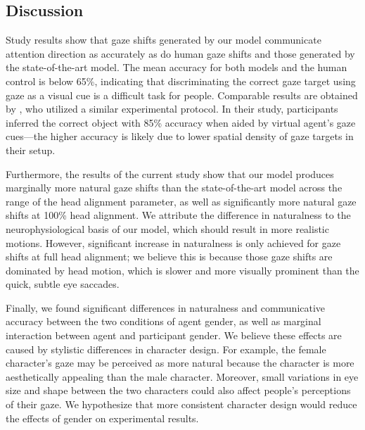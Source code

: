 \subsection{Discussion}

Study results show that gaze shifts generated by our model communicate attention direction as accurately as do human gaze shifts and those generated by the state-of-the-art model. The mean accuracy for both models and the human control is below 65\%, indicating that discriminating the correct gaze target using gaze as a visual cue is a difficult task for people. Comparable results are obtained by \citet{bailly2010gaze}, who utilized a similar experimental protocol. In their study, participants inferred the correct object with 85\% accuracy when aided by virtual agent's gaze cues---the higher accuracy is likely due to lower spatial density of gaze targets in their setup.

Furthermore, the results of the current study show that our model produces marginally more natural gaze shifts than the state-of-the-art model across the range of the head alignment parameter, as well as significantly more natural gaze shifts at 100\% head alignment. We attribute the difference in naturalness to the neurophysiological basis of our model, which should result in more realistic motions. However, significant increase in naturalness is only achieved for gaze shifts at full head alignment; we believe this is because those gaze shifts are dominated by head motion, which is slower and more visually prominent than the quick, subtle eye saccades.

Finally, we found significant differences in naturalness and communicative accuracy between the two conditions of agent gender, as well as marginal interaction between agent and participant gender. We believe these effects are caused by stylistic differences in character design. For example, the female character's gaze may be perceived as more natural because the character is more aesthetically appealing than the male character. Moreover, small variations in eye size and shape between the two characters could also affect people's perceptions of their gaze. We hypothesize that more consistent character design would reduce the effects of gender on experimental results.